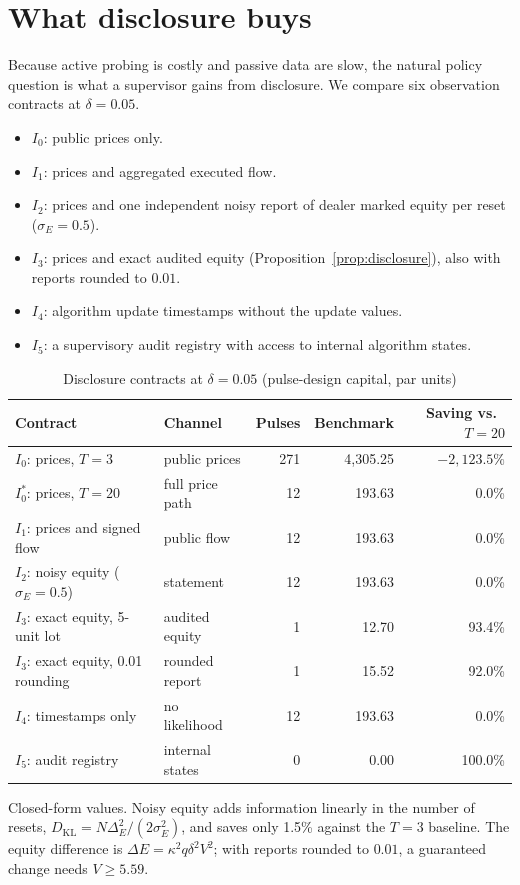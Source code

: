 \documentclass[12pt]{article}
\theoremstyle{definition}
\theoremstyle{remark}
\newcommand{\KL}{D_{\mathrm{KL}}}
\begin{document}
\section{What disclosure buys}\label{sec:disclosure}

Because active probing is costly and passive data are slow, the natural policy question is what a supervisor gains from disclosure. We compare six observation contracts at $\delta=0.05$.
\begin{itemize}[itemsep=1pt]
\item $I_0$: public prices only.
\item $I_1$: prices and aggregated executed flow.
\item $I_2$: prices and one independent noisy report of dealer marked equity per reset ($\sigma_E=0.5$).
\item $I_3$: prices and exact audited equity (Proposition~\ref{prop:disclosure}), also with reports rounded to $0.01$.
\item $I_4$: algorithm update timestamps without the update values.
\item $I_5$: a supervisory audit registry with access to internal algorithm states.
\end{itemize}

\begin{table}[t]\centering\small
\begin{threeparttable}
\caption{Disclosure contracts at $\delta=0.05$ (pulse-design capital, par units)}\label{tab:contracts}
\begin{tabular}{llrrr}
\toprule
Contract & Channel & Pulses & Benchmark & Saving vs.\ $T=20$\\
\midrule
$I_0$: prices, $T=3$ & public prices & 271 & 4{,}305.25 & $-2{,}123.5\%$\\
$I_0^*$: prices, $T=20$ & full price path & 12 & 193.63 & 0.0\%\\
$I_1$: prices and signed flow & public flow & 12 & 193.63 & 0.0\%\\
$I_2$: noisy equity ($\sigma_E=0.5$) & statement & 12 & 193.63 & 0.0\%\\
$I_3$: exact equity, 5-unit lot & audited equity & 1 & 12.70 & 93.4\%\\
$I_3$: exact equity, 0.01 rounding & rounded report & 1 & 15.52 & 92.0\%\\
$I_4$: timestamps only & no likelihood & 12 & 193.63 & 0.0\%\\
$I_5$: audit registry & internal states & 0 & 0.00 & 100.0\%\\
\bottomrule
\end{tabular}
\begin{tablenotes}\footnotesize\item Closed-form values. Noisy equity adds information linearly in the number of resets, $\KL=N\Delta_E^2/(2\sigma_E^2)$, and saves only 1.5\% against the $T=3$ baseline. The equity difference is $\Delta E=\kappa^2q\delta^2V^2$; with reports rounded to $0.01$, a guaranteed change needs $V\ge5.59$.\end{tablenotes}
\end{threeparttable}
\end{table}
\end{document}

